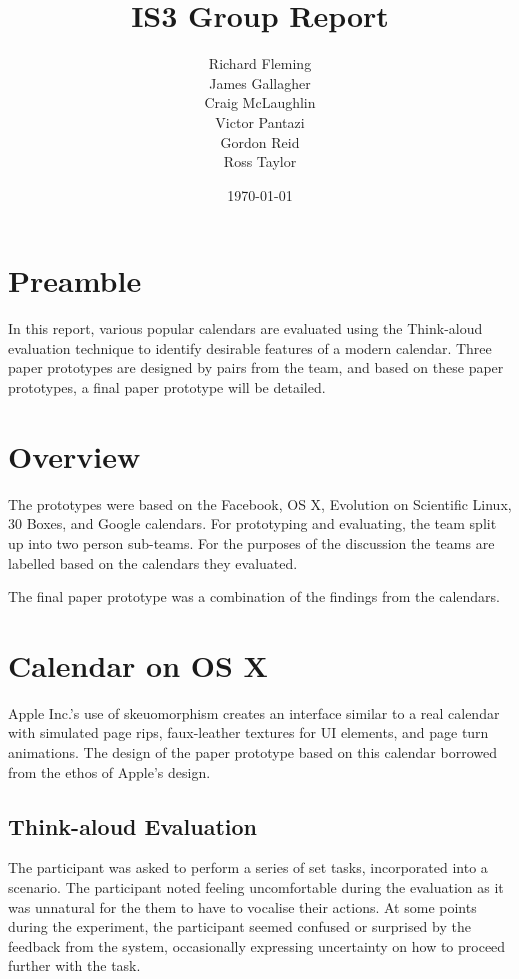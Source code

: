 \documentclass{article}
\title{IS3 Group Report}
\author{
  Richard Fleming \\
  James Gallagher \\
  Craig McLaughlin \\
  Victor Pantazi \\
  Gordon Reid \\
  Ross Taylor}
\date{\today}
\begin{document}

\maketitle


\section{Preamble}

In this report, various popular calendars are evaluated using the
Think-aloud evaluation technique to identify desirable features of a
modern calendar. Three paper prototypes are designed by pairs from the
team, and based on these paper prototypes, a final paper prototype will
be detailed.


\section{Overview}

The prototypes were based on the Facebook, OS X, Evolution on Scientific
Linux, 30 Boxes, and Google calendars. For prototyping and evaluating,
the team split up into two person sub-teams. For the purposes of the
discussion the teams are labelled based on the calendars they evaluated.

The final paper prototype was a combination of the findings from the
calendars.


\section{Calendar on OS X}

Apple Inc.'s use of skeuomorphism creates an interface similar to a real 
calendar with simulated page rips, faux-leather textures for UI
elements, and page turn animations. The design of the paper prototype
based on this calendar borrowed from the ethos of Apple's design.

\subsection{Think-aloud Evaluation}
The participant was asked to perform a series of set tasks, incorporated
into a scenario. The participant noted feeling uncomfortable during the
evaluation as it was unnatural for the them to have to vocalise their
actions. At some points during the experiment, the participant seemed
confused or surprised by the feedback from the system, occasionally
expressing uncertainty on how to proceed further with the task.
\end{document}
